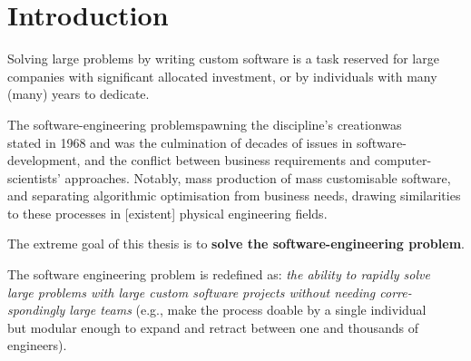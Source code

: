\chapter*{Introduction}\label{chap:Introduction}  
{}

Solving large problems by writing custom software is a task reserved for large companies with significant allocated investment, or by individuals with many (many) years to dedicate.

The software-engineering problem\textemdash{}spawning the discipline's creation\textemdash{}was\\stated in 1968\cite{mcilroyMassProducedSoftwareComponents1968} and was the culmination of decades of issues in software-development, and the conflict between business requirements and computer-\\scientists' approaches. Notably, mass production of mass customisable software, and separating algorithmic optimisation from business needs, drawing similarities to these processes in [existent] physical engineering fields.

The extreme goal of this thesis is to \textbf{solve the software-engineering problem}.

The software engineering problem is redefined as: \textit{the ability to rapidly solve\\large problems with large custom software projects without needing corre-\\spondingly large teams} (e.g., make the process doable by a single individual\\but modular enough to expand and retract between one and thousands of\\engineers).

